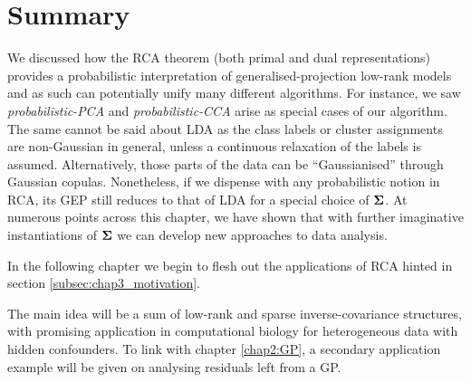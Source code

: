         


  \section{Summary}
    
                                                        
    We discussed how the RCA theorem (both primal and dual representations) provides a probabilistic interpretation of generalised-projection low-rank models and as such can potentially unify many different algorithms.
    For instance, we saw \textit{probabilistic-PCA} and \textit{probabilistic-CCA} arise as special cases of our algorithm.
    The same cannot be said about LDA as the class labels or cluster assignments are non-Gaussian in general,
    unless a continuous relaxation of the labels is assumed. Alternatively, those parts of the data can be
    ``Gaussianised'' through Gaussian copulas.
    Nonetheless, if we dispense with any probabilistic notion in RCA, its GEP still reduces to that of LDA for a special choice of $\mathbf{\Sigma}$.
    At numerous points across this chapter, we have shown that with further imaginative instantiations of $\mathbf{\Sigma}$ we can develop new approaches to data analysis.
    
    In the following chapter we begin to flesh out the applications of RCA hinted in section \ref{subsec:chap3_motivation}.
    
    The main idea will be a sum of low-rank and sparse inverse-covariance structures, with promising application in computational biology for heterogeneous data with hidden confounders.
    To link with chapter \ref{chap2:GP}, a secondary application example will be given on analysing residuals left from a GP.




